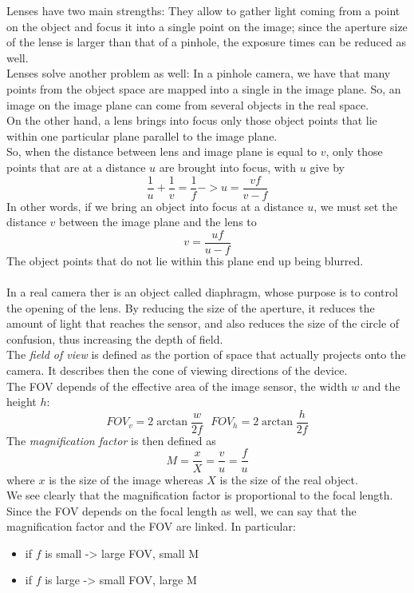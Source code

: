 Lenses have two main strengths: They allow to gather light coming from a point on the object and focus it into a single point on the image; since the aperture size of the lense is larger than that of a pinhole, the exposure times can be reduced as well. \\
Lenses solve another problem as well: In a pinhole camera, we have that many points from the object space are mapped into a single in the image plane. So, an image on the image plane can come from several objects in the real space. \\
On the other hand, a lens brings into focus only those object points that lie within one particular plane parallel to the image plane. \\
So, when the distance between lens and image plane is equal to $v$, only those points that are at a distance $u$ are brought into focus, with $u$ give by
$$
	\frac{1}{u} + \frac{1}{v} = \frac{1}{f} -> u = \frac{vf}{v-f}
$$
In other words, if we bring an object into focus at a distance $u$, we must set the distance $v$ between the image plane and the lens to
$$
	v = \frac{uf}{u-f}
$$
The object points that do not lie within this plane end up being blurred. \\ \\
In a real camera ther is an object called diaphragm, whose purpose is to control the opening of the lens. By reducing the size of the aperture, it reduces the amount of light that reaches the sensor, and also reduces the size of the circle of confusion, thus increasing the depth of field. \\
The \textit{field of view} is defined as the portion of space that actually projects onto the camera. It describes then the cone of viewing directions of the device. \\
The FOV depends of the effective area of the image sensor, the width $w$ and the height $h$:
$$
	FOV_v = 2\arctan{\frac{w}{2f}} \ \ \ FOV_h = 2\arctan{\frac{h}{2f}}
$$
The \textit{magnification factor} is then defined as 
$$
	M = \frac{x}{X} = \frac{v}{u} = \frac{f}{u}
$$
where $x$ is the size of the image whereas $X$ is the size of the real object. \\
We see clearly that the magnification factor is proportional to the focal length. \\ 
Since the FOV depends on the focal length as well, we can say that the magnification factor and the FOV are linked. In particular:
\begin{itemize}
	\item if $f$ is small -> large FOV, small M
	\item if $f$ is large -> small FOV, large M
\end{itemize}
